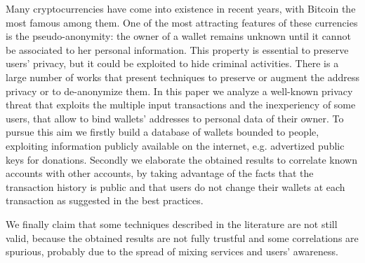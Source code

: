 Many cryptocurrencies have come into existence in recent years, with Bitcoin
the most famous among them. One of the most attracting features of these
currencies is the pseudo-anonymity: the owner of a wallet remains unknown until 
it cannot be associated to her personal information. 
This property is essential to preserve users' privacy, but it could be exploited to hide criminal activities. There is a large number of works that present techniques to preserve or augment the address privacy or to de-anonymize them.
In this paper we analyze a well-known 
privacy threat that exploits the multiple input transactions and the inexperiency of some users, that allow to bind wallets' addresses to personal
data of their owner.
To pursue this aim we firstly build a database of wallets bounded
to people, exploiting information publicly available on the internet, e.g.
advertized public keys for donations. 
Secondly we elaborate the obtained results to correlate known accounts with other accounts, by taking advantage of
the facts that the transaction history is public and that users do not change
their wallets at each transaction as suggested in the best practices.

We finally claim that some techniques described in the literature are not
still valid, because the obtained results are not fully trustful and some
correlations are spurious, probably due to the spread of mixing services and 
users' awareness.





